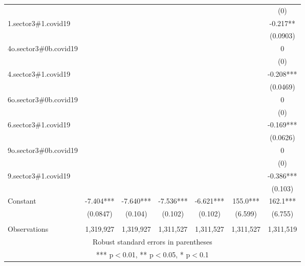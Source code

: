 \documentclass[]{article}
\begin{document}
\begin{tabular}{lcccccc}
 &  &  &  &  &  & (0) \\
1.sector3\#1.covid19 &  &  &  &  &  & -0.217** \\
 &  &  &  &  &  & (0.0903) \\
4o.sector3\#0b.covid19 &  &  &  &  &  & 0 \\
 &  &  &  &  &  & (0) \\
4.sector3\#1.covid19 &  &  &  &  &  & -0.208*** \\
 &  &  &  &  &  & (0.0469) \\
6o.sector3\#0b.covid19 &  &  &  &  &  & 0 \\
 &  &  &  &  &  & (0) \\
6.sector3\#1.covid19 &  &  &  &  &  & -0.169*** \\
 &  &  &  &  &  & (0.0626) \\
9o.sector3\#0b.covid19 &  &  &  &  &  & 0 \\
 &  &  &  &  &  & (0) \\
9.sector3\#1.covid19 &  &  &  &  &  & -0.386*** \\
 &  &  &  &  &  & (0.103) \\
Constant & -7.404*** & -7.640*** & -7.536*** & -6.621*** & 155.0*** & 162.1*** \\
 & (0.0847) & (0.104) & (0.102) & (0.102) & (6.599) & (6.755) \\
 &  &  &  &  &  &  \\
 Observations & 1,319,927 & 1,319,927 & 1,311,527 & 1,311,527 & 1,311,527 & 1,311,519 \\ \hline
\multicolumn{7}{c}{ Robust standard errors in parentheses} \\
\multicolumn{7}{c}{ *** p$<$0.01, ** p$<$0.05, * p$<$0.1} \\
\end{tabular}
\end{document}
